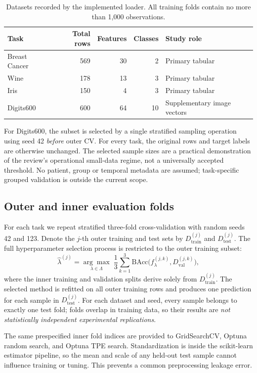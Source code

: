 \documentclass[11pt,a4paper]{article}
\begin{document}
\begin{table}[H]
\centering\caption{Datasets recorded by the implemented loader. All training folds contain no more than 1,000 observations.}
\small
\begin{tabular}{lrrrl}\toprule
Task & Total rows & Features & Classes & Study role\\\midrule
Breast Cancer & 569 & 30 & 2 & Primary tabular\\
Wine & 178 & 13 & 3 & Primary tabular\\
Iris & 150 & 4 & 3 & Primary tabular\\
Digits600 & 600 & 64 & 10 & Supplementary image vectors\\\bottomrule
\end{tabular}
\end{table}

For Digits600, the subset is selected by a single stratified sampling operation using seed 42 \emph{before} outer CV. For every task, the original rows and target labels are otherwise unchanged. The selected sample sizes are a practical demonstration of the review's operational small-data regime, not a universally accepted threshold. No patient, group or temporal metadata are assumed; task-specific grouped validation is outside the current scope.

\subsection{Outer and inner evaluation folds}
For each task we repeat stratified three-fold cross-validation with random seeds 42 and 123. Denote the $j$-th outer training and test sets by $D_{\mathrm{train}}^{(j)}$ and $D_{\mathrm{test}}^{(j)}$. The full hyperparameter selection process is restricted to the outer training subset:
\begin{equation}
\hat\lambda^{(j)}=\underset{\lambda\in\Lambda}{\arg\max}\;\frac{1}{3}\sum_{k=1}^{3}
\mathrm{BAcc}\bigl(f_{\lambda}^{(j,k)},D_{\mathrm{val}}^{(j,k)}\bigr),
\end{equation}
where the inner training and validation splits derive solely from $D_{\mathrm{train}}^{(j)}$. The selected method is refitted on all outer training rows and produces one prediction for each sample in $D_{\mathrm{test}}^{(j)}$. For each dataset and seed, every sample belongs to exactly one test fold; folds overlap in training data, so their results are \emph{not statistically independent experimental replications}.

The same prespecified inner fold indices are provided to GridSearchCV, Optuna random search, and Optuna TPE search. Standardization is inside the scikit-learn estimator pipeline, so the mean and scale of any held-out test sample cannot influence training or tuning. This prevents a common preprocessing leakage error.
\end{document}
